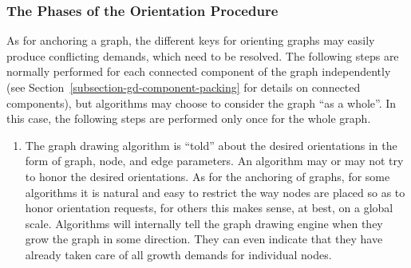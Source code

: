 {\subsubsection{The Phases of the Orientation Procedure}
\label{subsection-graph-orientation-phases}

As for anchoring a graph, the different keys for orienting graphs may
easily produce conflicting demands, which need to be
resolved. The following steps are normally performed for each
connected component of the graph independently (see 
Section~\ref{subsection-gd-component-packing} for details on connected components),
but algorithms may choose to consider the graph ``as a whole''. In
this case, the following steps are performed only once for the whole
graph. 

\begin{enumerate}
\item
  The graph drawing algorithm is ``told'' about the desired
  orientations in the form of graph, node, and edge parameters. 
  An algorithm may or may not try to honor the desired
  orientations. As for the anchoring of graphs, for some algorithms it
  is natural and easy to restrict the way nodes are placed so as to
  honor orientation requests, for others this makes sense, at best, on
  a global scale. Algorithms will internally tell the graph drawing
  engine when they grow the graph in some direction. They can even
  indicate that they have already taken care of all growth demands for
  individual nodes.


\end{enumerate}}
